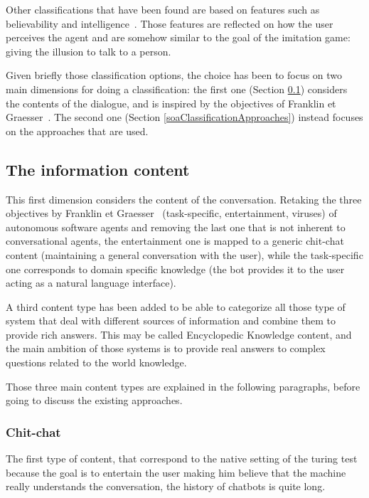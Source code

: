 Other classifications that have been found are based on features such as believability and intelligence~\cite{isbister2002design}. Those features are reflected on how the user perceives the agent and are somehow similar to the goal of the imitation game: giving the illusion to talk to a person.

Given briefly those classification options, the choice has been to focus on two main dimensions for doing a classification: the first one (Section \ref{soaClassificationContents}) considers the contents of the dialogue, and is inspired by the objectives of Franklin et Graesser~\cite{franklin1996agent}. The second one (Section \ref{soaClassificationApproaches}) instead focuses on the approaches that are used.

\subsection{The information content}
\label{soaClassificationContents}

This first dimension considers the content of the conversation. Retaking the three objectives by Franklin et Graesser~\cite{franklin1996agent} (task-specific, entertainment, viruses) of autonomous software agents and removing the last one that is not inherent to conversational agents, the entertainment one is mapped to a generic chit-chat content (maintaining a general conversation with the user), while the task-specific one corresponds to domain specific knowledge (the bot provides it to the user acting as a natural language interface).

A third content type has been added to be able to categorize all those type of system that deal with different sources of information and combine them to provide rich answers. This may be called Encyclopedic Knowledge content, and the main ambition of those systems is to provide real answers to complex questions related to the world knowledge.

Those three main content types are explained in the following paragraphs, before going to discuss the existing approaches.

\subsubsection{Chit-chat}
The first type of content, that correspond to the native setting of the turing test because the goal is to entertain the user making him believe that the machine really understands the conversation, the history of chatbots is quite long.

